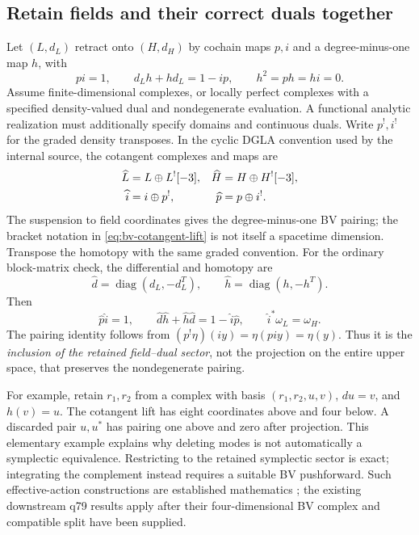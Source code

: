 \documentclass[11pt,a4paper]{article}
\begin{document}
\subsection{Retain fields and their correct duals together}
\label{sec:bv-cotangent-retract}

Let \((L,d_L)\) retract onto \((H,d_H)\) by cochain maps \(p,i\) and a
degree-minus-one map \(h\), with
\[
 pi=1,\qquad d_Lh+hd_L=1-ip,\qquad h^2=ph=hi=0.
\]
Assume finite-dimensional complexes, or locally perfect complexes with a
specified density-valued dual and nondegenerate evaluation. A functional
analytic realization must additionally specify domains and continuous duals.
Write \(p^!,i^!\) for the graded density transposes. In the cyclic DGLA
convention used by the internal source, the cotangent complexes and maps are
\begin{align}
 \widehat L&=L\oplus L^![-3],&
 \widehat H&=H\oplus H^![-3], \notag\\
 \widehat i&=i\oplus p^!,&
 \widehat p&=p\oplus i^!.
 \label{eq:bv-cotangent-lift}
\end{align}
The suspension to field coordinates gives the degree-minus-one BV pairing;
the bracket notation in \eqref{eq:bv-cotangent-lift} is not itself a
spacetime dimension. Transpose the homotopy with the same graded convention.
For the ordinary block-matrix check, the differential and homotopy are
\[
 \widehat d=\operatorname{diag}(d_L,-d_L^T),\qquad
 \widehat h=\operatorname{diag}(h,-h^T).
\]
Then
\[
 \widehat p\widehat i=1,\qquad
 \widehat d\widehat h+\widehat h\widehat d
   =1-\widehat i\widehat p,\qquad
 \widehat i^*\omega_L=\omega_H .
\]
The pairing identity follows from
\((p^!\eta)(iy)=\eta(piy)=\eta(y)\). Thus it is the \emph{inclusion of the
retained field--dual sector}, not the projection on the entire upper space,
that preserves the nondegenerate pairing.

For example, retain \(r_1,r_2\) from a complex with basis
\((r_1,r_2,u,v)\), \(du=v\), and \(h(v)=u\). The cotangent lift has eight
coordinates above and four below. A discarded pair \(u,u^*\) has pairing
one above and zero after projection. This elementary example explains why
deleting modes is not automatically a symplectic equivalence. Restricting
to the retained symplectic sector is exact; integrating the complement
instead requires a suitable BV pushforward. Such effective-action
constructions are established mathematics
\cite{CattaneoMnev2008}; the existing downstream q79 results apply after
their four-dimensional BV complex and compatible split have been supplied.
\end{document}
